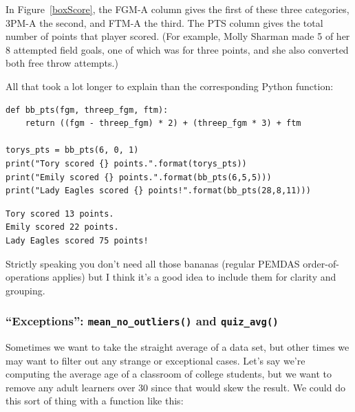 In Figure~\ref{boxScore}, the \textsf{FGM-A} column gives the first of these
three categories, \textsf{3PM-A} the second, and \textsf{FTM-A} the third. The
\textsf{PTS} column gives the total number of points that player scored. (For
example, Molly Sharman made 5 of her 8 attempted field goals, one of which was
for three points, and she also converted both free throw attempts.)

All that took a lot longer to explain than the corresponding Python function:


\begin{Verbatim}[fontsize=\footnotesize,samepage=true,frame=single,framesep=3mm]
def bb_pts(fgm, threep_fgm, ftm):
    return ((fgm - threep_fgm) * 2) + (threep_fgm * 3) + ftm

torys_pts = bb_pts(6, 0, 1)
print("Tory scored {} points.".format(torys_pts))
print("Emily scored {} points.".format(bb_pts(6,5,5)))
print("Lady Eagles scored {} points!".format(bb_pts(28,8,11)))
\end{Verbatim}
\vspace{-.2in}

\begin{Verbatim}[fontsize=\small,samepage=true,frame=leftline,framesep=5mm,framerule=1mm]
Tory scored 13 points.
Emily scored 22 points.
Lady Eagles scored 75 points!
\end{Verbatim}


Strictly speaking you don't need all those bananas (regular PEMDAS
order-of-operations applies) but I think it's a good idea to include them for
clarity and grouping.

\subsubsection{``Exceptions'': \texttt{mean\_no\_outliers()} and \texttt{quiz\_avg()}}

Sometimes we want to take the straight average of a data set, but other times
we may want to filter out any strange or exceptional cases. Let's say we're
computing the average age of a classroom of college students, but we want to
remove any adult learners over 30 since that would skew the result. We could do
this sort of thing with a function like this:


